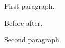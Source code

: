 \documentclass{article}
\begin{document}
First paragraph.

Before  after.

Second paragraph.
\end{document}
